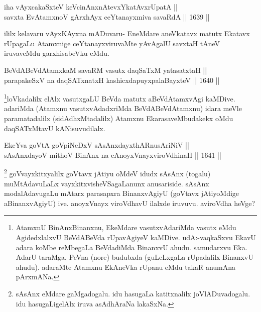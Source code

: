 \begin{shl}
iha vAyxcakaSxteV keVcinAnxnAtevxYkatAvxrUpatA || \\
savxta EvA\s \s tamxnoV gArxhAyx ceYtanayxmiva savaRdA \hfill || 1639 ||  
\end{shl}

\begin{artha}
ililx kelavaru vAyxKAyxna mADuvaru- EneMdare aneVkatavx matutx Ekatavx rUpagaLu Atamxnige ceYtanayxviruvaMte yAvAgalU savxtaH tAneV iruvaveMdu garxhisabeVku eMdu.
\end{artha}


\begin{shl}
BeVdABeVdAtamxkaM savaRM vasutx daqSaTxM yatasatxtaH ||  \\
parapakeSxV na daqSATxnatxH kashicxdapuyxpalaBayxteV \hfill || 1640 ||  
\end{shl}

\begin{artha}
\footnote{AtamxnU BinAnxBinanxnu, EkeMdare vasutxvAdariMda vasutx eMdu AgidedxlalxvU BeVdABeVda rUpavAgiyeV kaMDive. udA:-vaqkaSxvu EkavU adara koMbe reMbegaLa BeVdadiMda BinanxvU ahudu. samudarxvu Eka. AdarU taraMga, PeVna (nore) budubxda (guLeLxgaLa rUpadalilx BinanxvU ahudu). adaraMte Atamxnu EkAneVka rUpanu eMdu takaR anumAna pArxmANa.}loVkadalilx elAlx vasutxgaLU BeVda matutx aBeVdAtamxvAgi kaMDive. adariMda (Atamxnu vasutxvAdadxriMda BeVdABeVdAtamxnu) idara meVle paramatadalilx (sidAdhxMtadalilx) Atamxnu EkarasaveMbudakekx oMdu daqSATxMtavU kANisuvudilalx.
\end{artha}


\begin{shl}
EkeYva goVtA goVpiNeDxV sAsAnxdayxthARnusAriNiV || \\
sAsAnxdayoV mithoV BinAnx na cAnoyxVnayxviroVdhinaH \hfill || 1641 ||  
\end{shl}

\begin{artha}
\footnote{sAsAnx eMdare gaMgadogalu. idu hasugaLa katitxnalilx joVlADuvadogalu. idu hasugaLigelAlx iruva asAdhAraNa lakaSxNa.}
goVvayxkitxyalilx goVtavx jAtiyu oMdeV idudx sAsAnx (togalu) muMtAdavuLaLx vayxkitxvisheVSagaLanunx anusariside. sAsAnx modalAdavugaLu mAtarx parasapxra BinanxvAgiyU (goVtavx jAtiyoMdige aBinanxvAgiyU) ive. anoyxVnayx viroVdhavU ilalxde iruvuvu. aviroVdha heVge?
\end{artha}

